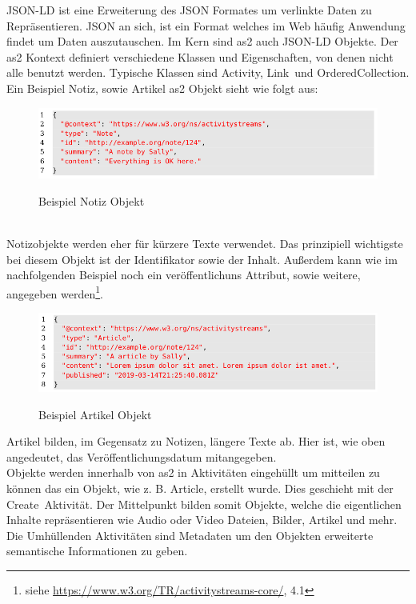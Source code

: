 {	\gls{JSON-LD} ist eine Erweiterung des JSON Formates um verlinkte Daten zu Repräsentieren. JSON an sich, ist ein Format welches im Web häufig Anwendung findet um Daten auszutauschen. Im Kern sind \gls{as2} auch \gls{JSON-LD} Objekte. Der \gls{as2} Kontext definiert verschiedene Klassen und Eigenschaften, von denen nicht alle benutzt werden. Typische Klassen sind \glqq Activity\grqq, \glqq Link\grqq~und \glqq OrderedCollection\grqq. Ein Beispiel Notiz, sowie Artikel \gls{as2} Objekt sieht wie folgt aus:~\\
	\begin{figure}[h]
		\begin{minipage}{\textwidth}
			\centering
			\includegraphics[scale=0.5]{figures/object-note.png}
			\label{fig:object-note}
			\caption{Beispiel Notiz Objekt}
		\end{minipage}
	\end{figure}~\\
	Notizobjekte werden eher für kürzere Texte verwendet. Das prinzipiell wichtigste bei diesem Objekt ist der Identifikator sowie der Inhalt. Außerdem kann wie im nachfolgenden Beispiel noch ein veröffentlichuns Attribut, sowie weitere, angegeben werden\footnote{siehe \url{https://www.w3.org/TR/activitystreams-core/}, 4.1}.
	\begin{figure}[h]
		\begin{minipage}{\textwidth}
			\centering
			\includegraphics[scale=0.5]{figures/object-article.png}
			\label{fig:object-article}
			\caption{Beispiel Artikel Objekt}
		\end{minipage}
	\end{figure}
	Artikel bilden, im Gegensatz zu Notizen, längere Texte ab. Hier ist, wie oben angedeutet, das Veröffentlichungsdatum mitangegeben.~\\
	
	Objekte werden innerhalb von \gls{as2} in Aktivitäten eingehüllt um mitteilen zu können das ein Objekt, wie z. B. \glqq Article\grqq, erstellt wurde. Dies geschieht mit der \glqq Create\grqq~Aktivität. Der Mittelpunkt bilden somit Objekte, welche die eigentlichen Inhalte repräsentieren wie Audio oder Video Dateien, Bilder, Artikel und mehr. Die Umhüllenden Aktivitäten sind Metadaten um den Objekten erweiterte semantische Informationen zu geben.~\\
}
